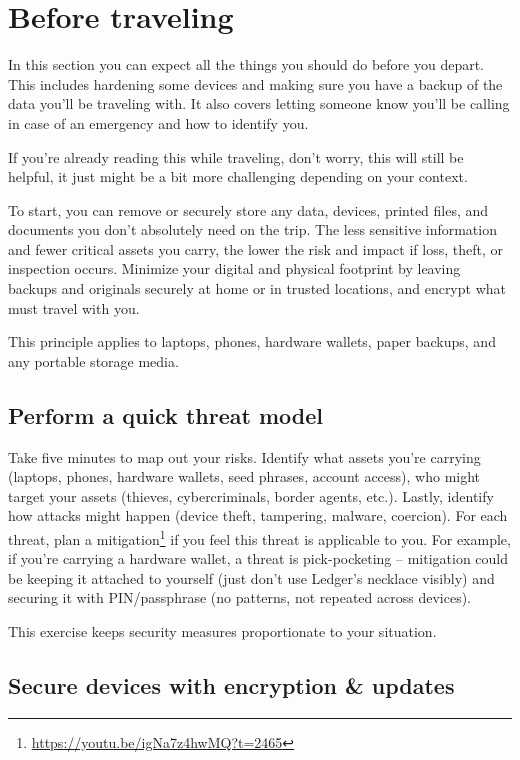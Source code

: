 \chapter{Before traveling}

In this section you can expect all the things you should
do before you depart. This includes hardening some devices
and making sure you have a backup of the data you'll be
traveling with. It also covers letting someone know you'll
be calling in case of an emergency and how to identify
you.

If you're already reading this while traveling, don't
worry, this will still be helpful, it just might be a bit
more challenging depending on your context.

To start, you can remove or securely store any data,
devices, printed files, and documents you don't absolutely
need on the trip. The less sensitive information and fewer
critical assets you carry, the lower the risk and impact
if loss, theft, or inspection occurs. Minimize your
digital and physical footprint by leaving backups and
originals securely at home or in trusted locations, and
encrypt what must travel with you.

This principle applies to laptops, phones, hardware
wallets, paper backups, and any portable storage media.

\section{Perform a quick threat model}

Take five minutes to map out your risks. Identify what
assets you're carrying (laptops, phones, hardware wallets,
seed phrases, account access), who might target your
assets (thieves, cybercriminals, border agents, etc.).
Lastly, identify how attacks might happen (device theft,
tampering, malware, coercion). For each threat, plan a
mitigation\footnote{\url{https://youtu.be/igNa7z4hwMQ?t=2465}}
if you feel this threat is applicable to you. For example,
if you're carrying a hardware wallet, a threat is
pick-pocketing -- mitigation could be keeping it attached
to yourself (just don't use Ledger's necklace visibly) and
securing it with PIN/passphrase (no patterns, not repeated
across devices).

This exercise keeps security measures proportionate to
your situation.

\section{Secure devices with encryption \& updates}

